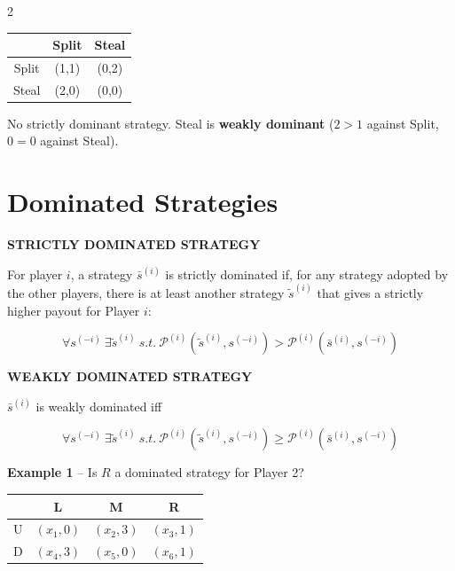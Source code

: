 \documentclass[a4paper,9pt]{extarticle}
\begin{document}
\begin{multicols}{2}
\begin{example}
\begin{center}
\begin{tabular}{c|cc}
 & Split & Steal \\
\hline
Split & (1,1) & (0,2) \\
Steal & (2,0) & (0,0) \\
\end{tabular}
\end{center}

No strictly dominant strategy. Steal is \textbf{weakly dominant} ($2 > 1$ against Split,
$0 = 0$ against Steal).

\end{example}



\section{Dominated Strategies}


\begin{definition}

\textbf{STRICTLY DOMINATED STRATEGY}

For player $i$, a strategy $\bar{s}^{(i)}$ is strictly dominated if, for any strategy
adopted by the other players, there is at least another strategy $\tilde{s}^{(i)}$ that
gives a strictly higher payout for Player $i$:

\[
\forall s^{(-i)} \ \exists \tilde{s}^{(i)} \ s.t. \
\mathcal{P}^{(i)}(\tilde{s}^{(i)}, s^{(-i)}) > \mathcal{P}^{(i)}(\bar{s}^{(i)}, s^{(-i)})
\]

\end{definition}


\begin{definition}

\textbf{WEAKLY DOMINATED STRATEGY}

$\bar{s}^{(i)}$ is weakly dominated iff

\[
\forall s^{(-i)} \ \exists \tilde{s}^{(i)} \ s.t. \
\mathcal{P}^{(i)}(\tilde{s}^{(i)}, s^{(-i)}) \ge \mathcal{P}^{(i)}(\bar{s}^{(i)}, s^{(-i)})
\]

\end{definition}


\begin{example}

\textbf{Example 1} -- Is $R$ a dominated strategy for Player 2?

\begin{center}
\begin{tabular}{c|ccc}
 & L & M & R \\
\hline
U & $(x_1,0)$ & $(x_2,3)$ & $(x_3,1)$ \\
D & $(x_4,3)$ & $(x_5,0)$ & $(x_6,1)$ \\
\end{tabular}
\end{center}


\end{example}
\end{multicols}
\end{document}
